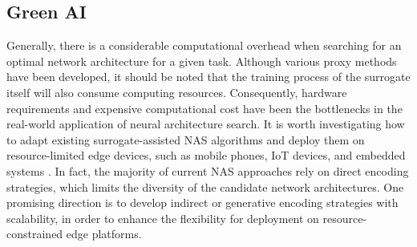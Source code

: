 \documentclass[journal]{IEEEtran}
\begin{document}
\subsection{Green AI}

Generally, there is a considerable computational overhead when searching for an optimal network architecture for a given task. Although various proxy methods have been developed, it should be noted that the training process of the surrogate itself will also consume computing resources. Consequently, hardware requirements and expensive computational cost have been the bottlenecks in the real-world application of neural architecture search. It is worth investigating how to adapt existing surrogate-assisted NAS algorithms and deploy them on resource-limited edge devices, such as mobile phones, IoT devices, and embedded systems \cite{sun2022gibbon}. In fact, the majority of current NAS approaches rely on direct encoding strategies, which limits the diversity of the candidate network architectures. One promising direction is to develop indirect or generative encoding strategies with scalability, in order to enhance the flexibility for deployment on resource-constrained edge platforms.



% 
% 
% 
% 


%
%
\end{document}
